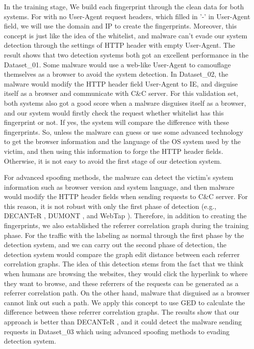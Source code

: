 In the training stage, We build each fingerprint through the clean data for both systems. For with no User-Agent request headers, which filled in '-' in User-Agent field, we will use the domain and IP to create the fingerprints. Moreover, this concept is just like the idea of the whitelist, and malware can't evade our system detection through the settings of HTTP header with empty User-Agent. The result shows that two detection systems both got an excellent performance in the Dataset\_01. Some malware would use a web-like User-Agent to camouflage themselves as a browser to avoid the system detection. In Dataset\_02, the malware would modify the HTTP header field User-Agent to IE, and disguise itself as a browser and communicate with C\&C server. For this validation set, both systems also got a good score when a malware disguises itself as a browser, and our system would firstly check the request whether whitelist has this fingerprint or not. If yes, the system will compare the difference with these fingerprints. So, unless the malware can guess or use some advanced technology to get the browser information and the language of the OS system used by the victim, and then using this information to forge the HTTP header fields. Otherwise, it is not easy to avoid the first stage of our detection system.

For advanced spoofing methods, the malware can detect the victim's system information such as browser version and system language, and then malware would modify the HTTP header fields when sending requests to C\&C server. For this reason, it is not robust with only the first phase of detection (e.g., DECANTeR \cite{bortolameotti2017decanter}, DUMONT \cite{schwenk2011adaptive}, and WebTap \cite{borders2004web}). Therefore, in addition to creating the fingerprints, we also established the referrer correlation graph during the training phase. For the traffic with the labeling as normal through the first phase by the detection system, and we can carry out the second phase of detection, the detection system would compare the graph edit distance between each referrer correlation graphs. The idea of this detection stems from the fact that we think when humans are browsing the websites, they would click the hyperlink to where they want to browse, and these referrers of the requests can be generated as a referrer correlation path. On the other hand, malware that disguised as a browser cannot link out such a path. We apply this concept to use GED to calculate the difference between these referrer correlation graphs. The results show that our approach is better than DECANTeR \cite{bortolameotti2017decanter}, and it could detect the malware sending requests in Dataset\_03 which using advanced spoofing methods to evading detection system.


